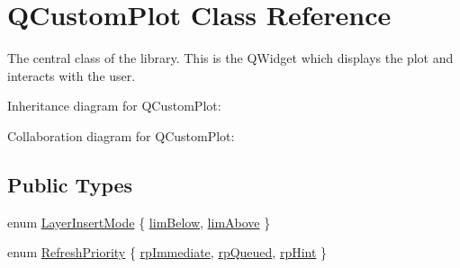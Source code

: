 \hypertarget{classQCustomPlot}{}\section{Q\+Custom\+Plot Class Reference}
\label{classQCustomPlot}


The central class of the library. This is the Q\+Widget which displays the plot and interacts with the user.  




Inheritance diagram for Q\+Custom\+Plot\+:


Collaboration diagram for Q\+Custom\+Plot\+:
\subsection*{Public Types}
\begin{DoxyCompactItemize}
\item 
enum \hyperlink{classQCustomPlot_a75a8afbe6ef333b1f3d47abb25b9add7}{Layer\+Insert\+Mode} \{ \hyperlink{classQCustomPlot_a75a8afbe6ef333b1f3d47abb25b9add7aee39cf650cd24e68552da0b697ce4a93}{lim\+Below}, 
\hyperlink{classQCustomPlot_a75a8afbe6ef333b1f3d47abb25b9add7a062b0b7825650b432a713c0df6742d41}{lim\+Above}
 \}
\item 
enum \hyperlink{classQCustomPlot_a45d61392d13042e712a956d27762aa39}{Refresh\+Priority} \{ \hyperlink{classQCustomPlot_a45d61392d13042e712a956d27762aa39a0d4831572370d871f2b7cb88806bac59}{rp\+Immediate}, 
\hyperlink{classQCustomPlot_a45d61392d13042e712a956d27762aa39aaaae083a19bc668597bf0f86e000f798}{rp\+Queued}, 
\hyperlink{classQCustomPlot_a45d61392d13042e712a956d27762aa39adfa1f2387617168d9299f4c8ad15b332}{rp\+Hint}
 \}
\end{DoxyCompactItemize}
